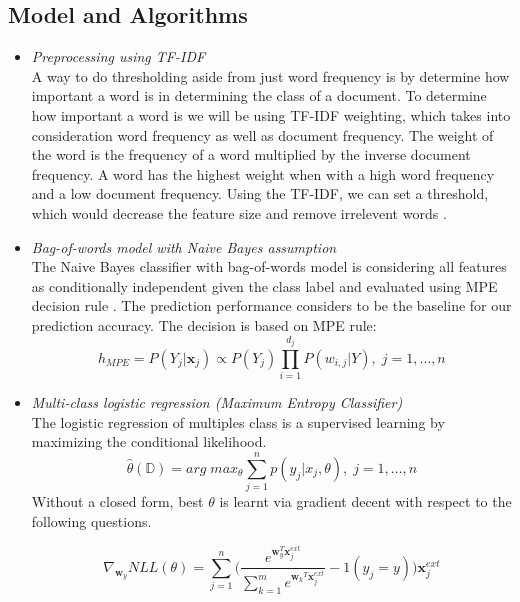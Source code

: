 \documentclass[10pt,twocolumn,letterpaper]{article}
\begin{document}
\subsection{Model and Algorithms}\label{model}
\begin{itemize}
	\item \textit{ Preprocessing using TF-IDF} \\
	A way to do thresholding aside from just word frequency is by determine how important a word is in determining the class of a document. To determine how important a word is we will be using TF-IDF  weighting, which takes into consideration word frequency as well as document frequency. The weight of the word is the frequency of a word multiplied by the inverse document frequency. A word has the highest weight when with a high word frequency and a low document frequency. Using the TF-IDF, we can set a threshold, which would decrease the feature size and remove irrelevent words \cite{schutze2008introduction}.
	
	\item \textit{Bag-of-words model with Naive Bayes assumption}\\
	 The Naive Bayes classifier with bag-of-words model is considering all features as conditionally independent given the class label and evaluated using MPE decision rule \cite{ishwarspring18}. The prediction performance considers to be the baseline for our prediction accuracy. 
	The decision is based on MPE rule:
	\[h_{MPE} = P(Y_j|\pmb{x}_j) \propto P(Y_j)\prod^{d_j}_{i=1}P(w_{i,j}|Y), \;j = 1,\ldots,n\]
	\item \textit{Multi-class logistic regression (Maximum Entropy Classifier)} \\
	The logistic regression of multiples class is a supervised learning by maximizing the conditional likelihood.
	\[\hat{\theta}(\mathbb{D}) = arg \; max_\theta \sum_{j=1}^{n}p(y_j|x_j,\theta), \;j = 1,\ldots,n\]Without a closed form, best $\theta$ is learnt via gradient decent with respect to the following questions. 
	
	\[\nabla_{\pmb{w}_y}NLL(\theta) = \sum_{j=1}^{n}\bigg(\frac{e^{\pmb{w}_y^T\pmb{x}_j^{ext}}}{\sum_{k=1}^{m}e^{{\pmb{w}_k}^T\pmb{x}_j^{ext}}}-1(y_j = y)\bigg)\pmb{x}^{ext}_{j}\]
	

\end{itemize}
\end{document}
